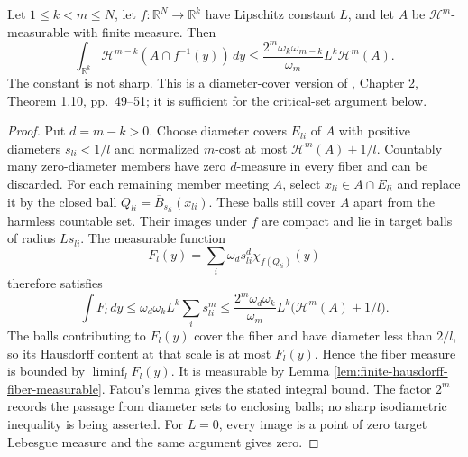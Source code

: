 \begin{proposition}\label{prop:coarse-lipschitz-slicing}
Let $1\leq k<m\leq N$, let $f:\mathbb R^N\to\mathbb R^k$ have Lipschitz constant $L$, and let $A$ be $\mathcal H^m$-measurable with finite measure. Then
\[
 \int_{\mathbb R^k}\mathcal H^{m-k}(A\cap f^{-1}(y))\,dy
 \leq \frac{2^m\omega_k\omega_{m-k}}{\omega_m}L^k\mathcal H^m(A).
\]
The constant is not sharp. This is a diameter-cover version of \cite{Sim18}, Chapter 2, Theorem 1.10, pp.~49--51; it is sufficient for the critical-set argument below.
\end{proposition}
\begin{proof}
Put $d=m-k>0$. Choose diameter covers $E_{li}$ of $A$ with positive diameters $s_{li}<1/l$ and normalized $m$-cost at most $\mathcal H^m(A)+1/l$. Countably many zero-diameter members have zero $d$-measure in every fiber and can be discarded. For each remaining member meeting $A$, select $x_{li}\in A\cap E_{li}$ and replace it by the closed ball $Q_{li}=\overline B_{s_{li}}(x_{li})$. These balls still cover $A$ apart from the harmless countable set. Their images under $f$ are compact and lie in target balls of radius $Ls_{li}$. The measurable function
\[
 F_l(y)=\sum_i\omega_d s_{li}^d\chi_{f(Q_{li})}(y)
\]
therefore satisfies
\[
 \int F_l\,dy\leq\omega_d\omega_kL^k\sum_i s_{li}^{m}
 \leq\frac{2^m\omega_d\omega_k}{\omega_m}L^k
       \bigl(\mathcal H^m(A)+1/l\bigr).
\]
The balls contributing to $F_l(y)$ cover the fiber and have diameter less than $2/l$, so its Hausdorff content at that scale is at most $F_l(y)$. Hence the fiber measure is bounded by $\liminf_lF_l(y)$. It is measurable by Lemma \ref{lem:finite-hausdorff-fiber-measurable}. Fatou's lemma gives the stated integral bound. The factor $2^m$ records the passage from diameter sets to enclosing balls; no sharp isodiametric inequality is being asserted. For $L=0$, every image is a point of zero target Lebesgue measure and the same argument gives zero.
\end{proof}

